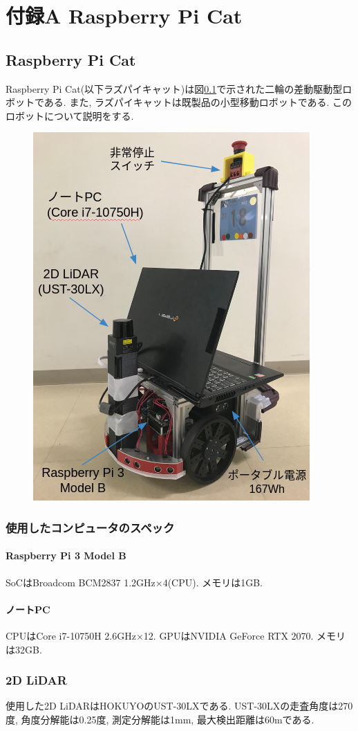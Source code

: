 \chapter*{付録A Raspberry Pi Cat}

\section{Raspberry Pi Cat}
Raspberry Pi Cat(以下ラズパイキャット)は図\ref{fig:raspicat}で示された二輪の差動駆動型ロボットである. 
また, ラズパイキャットは既製品の小型移動ロボットである.
このロボットについて説明をする.
\begin{figure}[H]
	\begin{center}
		\includegraphics[width=0.5\linewidth]{figs/raspicat.png}
		\caption{}
		\label{fig:raspicat}
	\end{center}
\end{figure}

\subsection{使用したコンピュータのスペック}

\subsubsection{Raspberry Pi 3 Model B}
SoCはBroadcom BCM2837 1.2GHz×4(CPU).
メモリは1GB.
\subsubsection{ノートPC}
CPUはCore i7-10750H 2.6GHz×12. 
GPUはNVIDIA GeForce RTX 2070.
メモリは32GB.

\subsection{2D LiDAR}
使用した2D LiDARはHOKUYOのUST-30LXである.
UST-30LXの走査角度は270度, 角度分解能は0.25度, 測定分解能は1mm, 最大検出距離は60mである.

